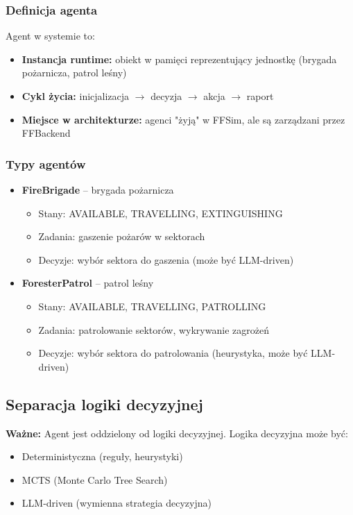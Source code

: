 \subsubsection{Definicja agenta}

Agent w systemie to:
\begin{itemize}
    \item \textbf{Instancja runtime:} obiekt w pamięci reprezentujący jednostkę (brygada pożarnicza, patrol leśny)
    \item \textbf{Cykl życia:} inicjalizacja $\rightarrow$ decyzja $\rightarrow$ akcja $\rightarrow$ raport
    \item \textbf{Miejsce w architekturze:} agenci "żyją" w FFSim, ale są zarządzani przez FFBackend
\end{itemize}

\subsubsection{Typy agentów}

\begin{itemize}
    \item \textbf{FireBrigade} -- brygada pożarnicza
    \begin{itemize}
        \item Stany: AVAILABLE, TRAVELLING, EXTINGUISHING
        \item Zadania: gaszenie pożarów w sektorach
        \item Decyzje: wybór sektora do gaszenia (może być LLM-driven)
    \end{itemize}
    
    \item \textbf{ForesterPatrol} -- patrol leśny
    \begin{itemize}
        \item Stany: AVAILABLE, TRAVELLING, PATROLLING
        \item Zadania: patrolowanie sektorów, wykrywanie zagrożeń
        \item Decyzje: wybór sektora do patrolowania (heurystyka, może być LLM-driven)
    \end{itemize}
\end{itemize}

\subsection{Separacja logiki decyzyjnej}

\textbf{Ważne:} Agent jest oddzielony od logiki decyzyjnej. Logika decyzyjna może być:
\begin{itemize}
    \item Deterministyczna (reguły, heurystyki)
    \item MCTS (Monte Carlo Tree Search)
    \item LLM-driven (wymienna strategia decyzyjna)
\end{itemize}

